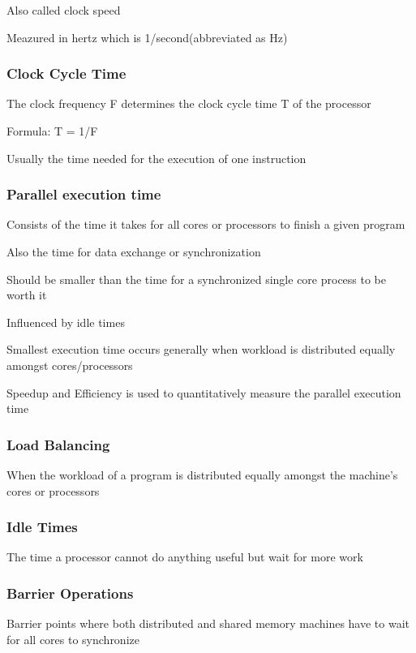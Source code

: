 \documentclass{article}
\begin{document}
Also called clock speed

Meazured in hertz which is 1/second(abbreviated as Hz)

\subsubsection{Clock Cycle Time}

The clock frequency F determines the clock cycle time T of the processor

Formula: T = 1/F

Usually the time needed for the execution of one instruction

\subsubsection{Parallel execution time}

Consists of the time it takes for all cores or processors to finish a given program

Also the time for data exchange or synchronization

Should be smaller than the time for a synchronized single core process to be worth it

Influenced by idle times

Smallest execution time occurs generally when workload is distributed equally amongst cores/processors

Speedup and Efficiency is used to quantitatively measure the parallel execution time

\subsubsection{Load Balancing}

When the workload of a program is distributed equally amongst the machine's cores or processors

\subsubsection{Idle Times}

The time a processor cannot do anything useful but wait for more work

\subsubsection{Barrier Operations}

Barrier points where both distributed and shared memory machines have to wait for all cores to synchronize
\end{document}
